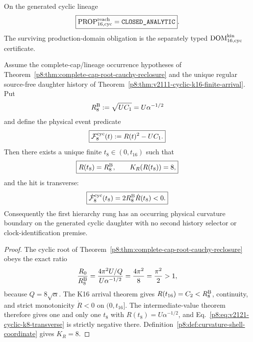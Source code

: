 \documentclass[12pt,a4paper]{article}
\begin{document}
\begin{corollary}
\label{p8:cor:v2111-cyclic-k16-reach-status}
On the generated cyclic lineage
\[
 \boxed{\mathrm{PROP}^{\rm reach}_{16,\rm cyc}=\texttt{CLOSED\_ANALYTIC}}.
\]
The surviving production-domain obligation is the separately typed
$\mathrm{DOM}^{\rm kin}_{16,\rm cyc}$ certificate.
\end{corollary}

\begin{theorem}
\label{p8:thm:v2121-cyclic-k8-born-boundary}
Assume the complete-cap/lineage occurrence hypotheses of
Theorem~\ref{p8:thm:complete-cap-root-cauchy-reclosure} and the unique regular
source-free daughter history of
Theorem~\ref{p8:thm:v2111-cyclic-k16-finite-arrival}.  Put
\[
 R_8^{\rm B}:=\sqrt{UC_1}=U\alpha^{-1/2}
\]
and define the physical event predicate
\begin{equation}
\label{p8:eq:v2121-cyclic-k8-event-predicate}
 \boxed{\mathcal F^{\rm cyc}_8(t):=R(t)^2-UC_1.}
\end{equation}
Then there exists a unique finite \(t_8\in(0,t_{16})\) such that
\begin{equation}
\label{p8:eq:v2121-cyclic-k8-hit}
 \boxed{R(t_8)=R_8^{\rm B},\qquad K_R(R(t_8))=8,}
\end{equation}
and the hit is transverse:
\begin{equation}
\label{p8:eq:v2121-cyclic-k8-transverse}
 \boxed{\dot{\mathcal F}^{\rm cyc}_8(t_8)
 =2R_8^{\rm B}\dot R(t_8)<0.}
\end{equation}
Consequently the first hierarchy rung has an occurring physical curvature
boundary on the generated cyclic daughter with no second history selector or
clock-identification premise.
\end{theorem}

\begin{proof}
The cyclic root of Theorem~\ref{p8:thm:complete-cap-root-cauchy-reclosure}
obeys the exact ratio
\[
 \frac{R_0}{R_8^{\rm B}}
 =\frac{4\pi^2U/Q}{U\alpha^{-1/2}}
 =\frac{4\pi^2}{8}
 =\frac{\pi^2}{2}>1,
\]
because \(Q=8\sqrt\alpha\).  The K16 arrival theorem gives
\(R(t_{16})=C_2<R_8^{\rm B}\), continuity, and strict monotonicity
\(\dot R<0\) on \((0,t_{16}]\).  The intermediate-value theorem therefore
gives one and only one \(t_8\) with \(R(t_8)=U\alpha^{-1/2}\), and
Eq.~\eqref{p8:eq:v2121-cyclic-k8-transverse} is strictly negative there.
Definition~\ref{p8:def:curvature-shell-coordinate} gives \(K_R=8\).
\end{proof}
\end{document}
